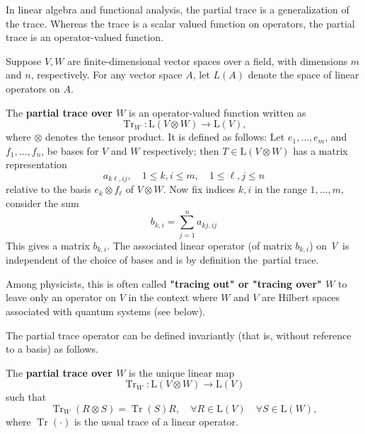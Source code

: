 
In linear algebra and functional analysis, the partial trace is a generalization of the trace. 
Whereas the trace is a scalar valued function on operators, the partial trace is an operator-valued function.

Suppose $V, W$ are finite-dimensional vector spaces over a field, with dimensions $m$ and $n$, respectively. 
For any vector space $A$, let $L(A)$ denote the space of linear operators on $A$.

\begin{definition}\label{defn:partial-trace-1}
The \textbf{partial trace over $W$} is an operator-valued function written as
\begin{equation}
    \operatorname{Tr}_W: \mathrm{L}(V \otimes W) \rightarrow \mathrm{L}(V),
\end{equation}
where $\otimes$ denotes the tensor product. It is defined as follows: Let $e_1, \ldots, e_m$, and $f_1, \ldots, f_n$, be bases for $V$ and $W$ respectively; then $T \in \mathrm{L}(V \otimes W)$ has a matrix representation
\begin{equation}
    a_{k \ell, i j}, \quad 1 \leq k, i \leq m, \quad 1 \leq \ell, j \leq n
\end{equation}
relative to the basis $e_k \otimes f_{\ell}$ of $V \otimes W$. Now fix indices $k, i$ in the range $1, \ldots, m$, consider the sum
\begin{equation}
    b_{k, i}=\sum_{j=1}^n a_{k j, i j}
\end{equation}
This gives a matrix $b_{k, i}$. The associated linear operator (of matrix $b_{k, i}$) on \textit{V} is independent of the choice of bases and is by definition the partial trace.
\end{definition}

Among physicists, this is often called \textbf{"tracing out" or "tracing over" $W$} to leave only an operator on $V$ in the context where $W$ and $V$ are Hilbert spaces associated with quantum systems (see below).

The partial trace operator can be defined invariantly (that is, without reference to a basis) as follows.

\begin{definition}
The \textbf{partial trace over $W$} is the unique linear map
\begin{equation}
    \operatorname{Tr}_W: \mathrm{L}(V \otimes W) \rightarrow \mathrm{L}(V)
\end{equation}
such that
\begin{equation}
    \label{eq:partial-trace-defn}
    \operatorname{Tr}_W(R \otimes S)=\operatorname{Tr}(S) R, \quad \forall R \in \mathrm{L}(V) \quad \forall S \in \mathrm{L}(W),
\end{equation}
where $\operatorname{Tr}(\cdot)$ is the usual trace of a linear operator.
\end{definition}

